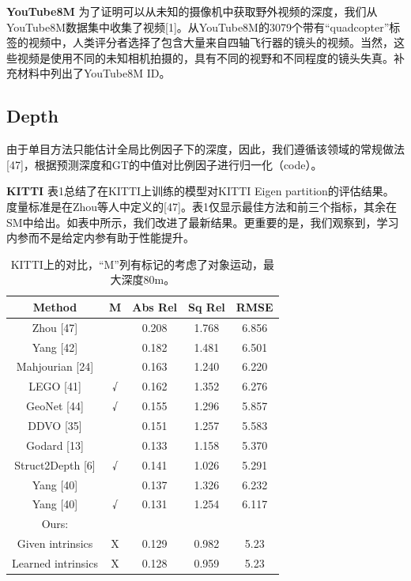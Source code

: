 \documentclass[10pt,journal,compsoc,UTF8]{IEEEtran}
\begin{document}
\textbf{YouTube8M} 为了证明可以从未知的摄像机中获取野外视频的深度，我们从YouTube8M数据集中收集了视频[1]。从YouTube8M的3079个带有“quadcopter”标签的视频中，人类评分者选择了包含大量来自四轴飞行器的镜头的视频。当然，这些视频是使用不同的未知相机拍摄的，具有不同的视野和不同程度的镜头失真。补充材料中列出了YouTube8M ID。

\subsection{Depth}
由于单目方法只能估计全局比例因子下的深度，因此，我们遵循该领域的常规做法[47]，根据预测深度和GT的中值对比例因子进行归一化（code）。

\textbf{KITTI} 表1总结了在KITTI上训练的模型对KITTI Eigen partition的评估结果。度量标准是在Zhou等人中定义的[47]。表1仅显示最佳方法和前三个指标，其余在SM中给出。如表中所示，我们改进了最新结果。更重要的是，我们观察到，学习内参而不是给定内参有助于性能提升。
\begin{table}
  \centering
  \begin{tabular}{|c|c|c|c|c|}
  \hline
  Method&M&Abs Rel&Sq Rel& RMSE\\
  \hline
  Zhou [47]       &  &  0.208& 1.768& 6.856\\
  Yang [42]       &  &  0.182& 1.481& 6.501\\
  Mahjourian [24] &  &  0.163& 1.240& 6.220\\
  LEGO [41]       & √&  0.162& 1.352& 6.276\\
  GeoNet [44]     & √&  0.155& 1.296& 5.857\\
  DDVO [35]       &  &  0.151& 1.257& 5.583\\
  Godard [13]     &  &  0.133& 1.158& 5.370\\
  Struct2Depth [6]& √&  0.141& 1.026& 5.291\\
  Yang [40]       &  &  0.137& 1.326& 6.232\\
  Yang [40]       & √&  0.131& 1.254& 6.117\\
  \hline
  Ours:&&&&\\
  Given intrinsics& X& 0.129& 0.982& 5.23\\
  Learned intrinsics& X &0.128& 0.959& 5.23\\
  \hline
  \end{tabular}
  \caption{KITTI上的对比，“M”列有标记的考虑了对象运动，最大深度80m。}
\end{table}
\end{document}
